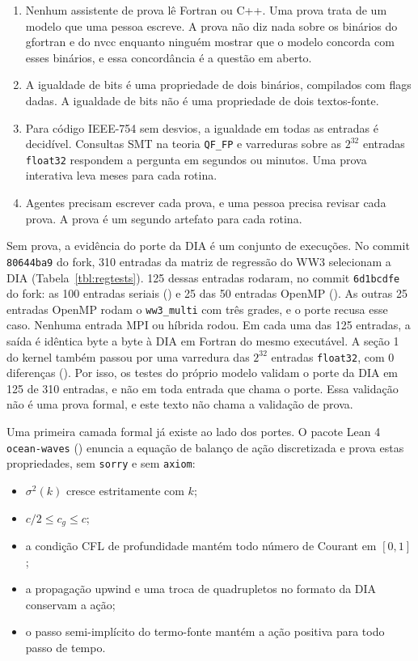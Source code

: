\documentclass[10pt,a4paper,]{article}
\providecommand{\tightlist}{\setlength{\itemsep}{0pt}\setlength{\parskip}{0pt}}
\begin{document}
\begin{enumerate}
\def\labelenumi{\arabic{enumi}.}
\tightlist
\item
  Nenhum assistente de prova lê Fortran ou C++. Uma prova trata de um
  modelo que uma pessoa escreve. A prova não diz nada sobre os binários
  do gfortran e do nvcc enquanto ninguém mostrar que o modelo concorda
  com esses binários, e essa concordância é a questão em aberto.
\item
  A igualdade de bits é uma propriedade de dois binários, compilados com
  flags dadas. A igualdade de bits não é uma propriedade de dois
  textos-fonte.
\item
  Para código IEEE-754 sem desvios, a igualdade em todas as entradas é
  decidível. Consultas SMT na teoria \texttt{QF\_FP} e varreduras sobre
  as \(2^{32}\) entradas \texttt{float32} respondem a pergunta em
  segundos ou minutos. Uma prova interativa leva meses para cada rotina.
\item
  Agentes precisam escrever cada prova, e uma pessoa precisa revisar
  cada prova. A prova é um segundo artefato para cada rotina.
\end{enumerate}

Sem prova, a evidência do porte da DIA é um conjunto de execuções. No
commit \texttt{80644ba9} do fork, 310 entradas da matriz de regressão do
WW3 selecionam a DIA (Tabela~\ref{tbl:regtests}). 125 dessas entradas
rodaram, no commit \texttt{6d1bcdfe} do fork: as 100 entradas seriais
() e 25 das 50 entradas
OpenMP (). As outras 25 entradas
OpenMP rodam o \texttt{ww3\_multi} com três grades, e o porte recusa
esse caso. Nenhuma entrada MPI ou híbrida rodou. Em cada uma das 125
entradas, a saída é idêntica byte a byte à DIA em Fortran do mesmo
executável. A seção 1 do kernel também passou por uma varredura das
\(2^{32}\) entradas \texttt{float32}, com 0 diferenças
(). Por isso, os testes do próprio
modelo validam o porte da DIA em 125 de 310 entradas, e não em toda
entrada que chama o porte. Essa validação não é uma prova formal, e este
texto não chama a validação de prova.

Uma primeira camada formal já existe ao lado dos portes. O pacote Lean 4
\texttt{ocean-waves} () enuncia
a equação de balanço de ação discretizada e prova estas propriedades,
sem \texttt{sorry} e sem \texttt{axiom}:

\begin{itemize}
\tightlist
\item
  \(\sigma^2(k)\) cresce estritamente com \(k\);
\item
  \(c/2 \le c_g \le c\);
\item
  a condição CFL de profundidade mantém todo número de Courant em
  \([0, 1]\);
\item
  a propagação upwind e uma troca de quadrupletos no formato da DIA
  conservam a ação;
\item
  o passo semi-implícito do termo-fonte mantém a ação positiva para todo
  passo de tempo.
\end{itemize}
\end{document}
